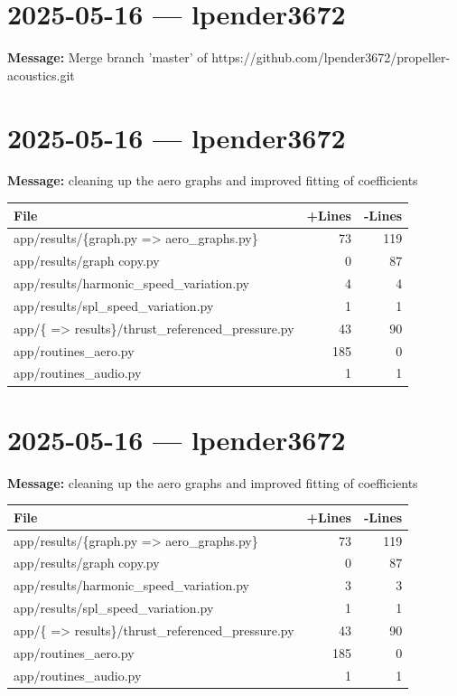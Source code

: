 \documentclass{article}
\begin{document}
\section*{2025-05-16 --- lpender3672}
\textbf{Message:} Merge branch 'master' of https://github.com/lpender3672/propeller-acoustics.git

\section*{2025-05-16 --- lpender3672}
\textbf{Message:} cleaning up the aero graphs and improved fitting of coefficients

\begin{longtable}{|p{10cm}|r|r|}
\hline \textbf{File} & \textbf{+Lines} & \textbf{-Lines} \\
\hline
app/results/\{graph.py => aero\_graphs.py\} & 73 & 119 \\
\hline
app/results/graph copy.py & 0 & 87 \\
\hline
app/results/harmonic\_speed\_variation.py & 4 & 4 \\
\hline
app/results/spl\_speed\_variation.py & 1 & 1 \\
\hline
app/\{ => results\}/thrust\_referenced\_pressure.py & 43 & 90 \\
\hline
app/routines\_aero.py & 185 & 0 \\
\hline
app/routines\_audio.py & 1 & 1 \\
\hline
\end{longtable}

\section*{2025-05-16 --- lpender3672}
\textbf{Message:} cleaning up the aero graphs and improved fitting of coefficients

\begin{longtable}{|p{10cm}|r|r|}
\hline \textbf{File} & \textbf{+Lines} & \textbf{-Lines} \\
\hline
app/results/\{graph.py => aero\_graphs.py\} & 73 & 119 \\
\hline
app/results/graph copy.py & 0 & 87 \\
\hline
app/results/harmonic\_speed\_variation.py & 3 & 3 \\
\hline
app/results/spl\_speed\_variation.py & 1 & 1 \\
\hline
app/\{ => results\}/thrust\_referenced\_pressure.py & 43 & 90 \\
\hline
app/routines\_aero.py & 185 & 0 \\
\hline
app/routines\_audio.py & 1 & 1 \\
\hline
\end{longtable}
\end{document}
